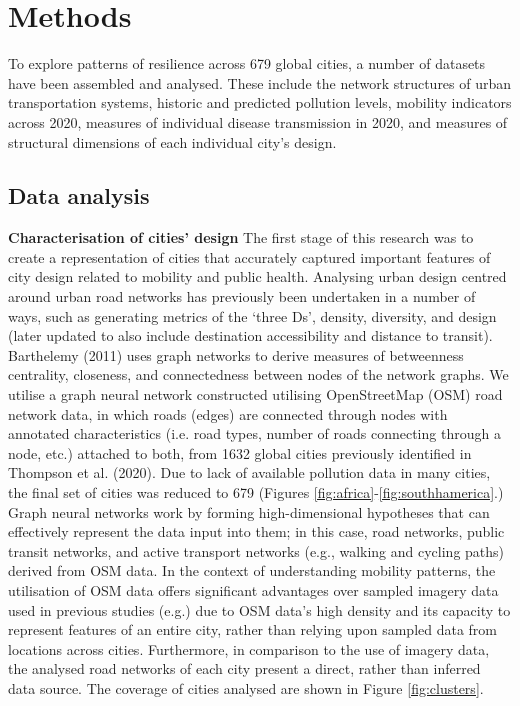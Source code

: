 \documentclass[preprint,12pt]{elsarticle}
\begin{document}





\section*{Methods}

To explore patterns of resilience across 679 global cities, a number of datasets have been assembled and analysed. These include the network structures of urban transportation systems, historic and predicted pollution levels, mobility indicators across 2020, measures of individual disease transmission in 2020, and measures of structural dimensions of each individual city's design.

\subsection*{Data analysis}
\textbf{Characterisation of cities' design}
The first stage of this research was to create a representation of cities that accurately captured important features of city design related to mobility and public health. Analysing urban design centred around urban road networks has previously been undertaken in a number of ways, such as generating metrics of the `three Ds'\cite{Ewing2010}, density, diversity, and design (later updated to also include destination accessibility and distance to transit). Barthelemy (2011)\cite{Barthelemy2011} uses graph networks to derive measures of betweenness centrality, closeness, and connectedness between nodes of the network graphs. We utilise a graph neural network constructed utilising OpenStreetMap (OSM) road network data\cite{Boeing2017a}, in which roads (edges) are connected through nodes with annotated characteristics (i.e. road types, number of roads connecting through a node, etc.) attached to both, from 1632 global cities previously identified in Thompson et al. (2020)\cite{Thompson2020}. Due to lack of available pollution data in many cities, the final set of cities was reduced to 679 (Figures \ref{fig:africa}-\ref{fig:southhamerica}.) Graph neural networks work by forming high-dimensional hypotheses that can effectively represent the data input into them; in this case, road networks, public transit networks, and active transport networks (e.g., walking and cycling paths) derived from OSM data. In the context of understanding mobility patterns, the utilisation of OSM data offers significant advantages over sampled imagery data used in previous studies (e.g.\cite{Thompson2020,seneviratne2021self}) due to OSM data's high density and its capacity to represent features of an entire city, rather than relying upon sampled data from locations across cities. Furthermore, in comparison to the use of imagery data, the analysed road networks of each city present a direct, rather than inferred data source. The coverage of cities analysed are shown in Figure \ref{fig:clusters}.
\end{document}
